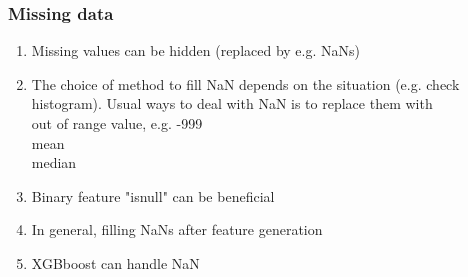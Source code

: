 \documentclass[11pt, twoside]{article}   	%
\begin{document}
\subsubsection{Missing data}
\renewcommand{\labelenumii}{\alph{enumii}}
\begin{enumerate}
      \item Missing values can be hidden (replaced by e.g. NaNs)
      \item  The choice of method to fill NaN depends on the situation (e.g. check histogram). Usual ways to deal with NaN is to replace them with   
        \\\indent out of range value, e.g. -999
        \\\indent mean       
        \\\indent median         
  \item  Binary feature "isnull" can be beneficial
  \item In general, filling NaNs after feature generation 
  \item XGBboost can handle NaN

  \end{enumerate}
\end{document}
